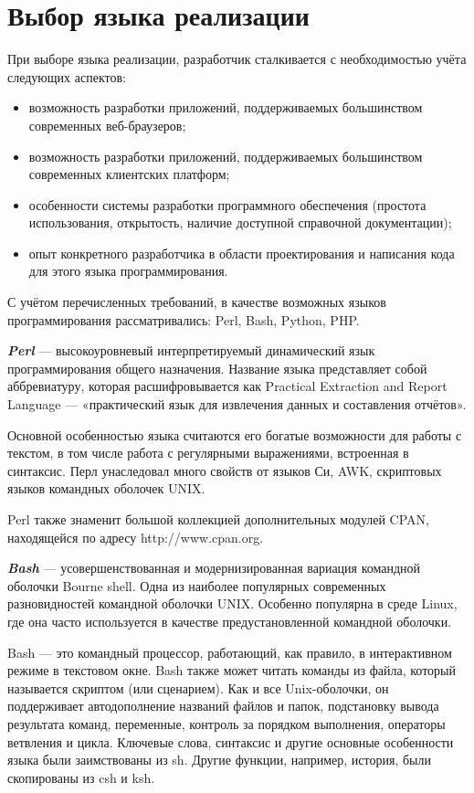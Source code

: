 \section{Выбор языка реализации} \label{technologic_langiage}


При выборе языка реализации, разработчик сталкивается с необходимостью учёта следующих аспектов:
\begin{itemize}
	\item возможность разработки приложений, поддерживаемых большинством современных веб-браузеров;
	\item возможность разработки приложений, поддерживаемых большинством современных клиентских платформ;
	\item особенности системы разработки программного обеспечения (простота использования, открытость, наличие доступной справочной документации);
	\item опыт конкретного разработчика в области проектирования и написания кода для этого языка программирования.
\end{itemize}

С учётом перечисленных требований, в качестве возможных языков программирования рассматривались: Perl, Bash, Python, PHP.

\vspace{\baselineskip}
\textbf{\textit{Perl}} ---  высокоуровневый интерпретируемый динамический язык программирования общего назначения. Название языка представляет собой аббревиатуру, которая расшифровывается как Practical Extraction and Report Language — «практический язык для извлечения данных и составления отчётов».

Основной особенностью языка считаются его богатые возможности для работы с текстом, в том числе работа с регулярными выражениями, встроенная в синтаксис. Перл унаследовал много свойств от языков Си, AWK, скриптовых языков командных оболочек UNIX.

Perl также знаменит большой коллекцией дополнительных модулей CPAN, находящейся по адресу http://www.cpan.org.

\vspace{\baselineskip}
\textbf{\textit{Bash}} --- усовершенствованная и модернизированная вариация командной оболочки Bourne shell. Одна из наиболее популярных современных разновидностей командной оболочки UNIX. Особенно популярна в среде Linux, где она часто используется в качестве предустановленной командной оболочки.

Bash — это командный процессор, работающий, как правило, в интерактивном режиме в текстовом окне. Bash также может читать команды из файла, который называется скриптом (или сценарием). Как и все Unix-оболочки, он поддерживает автодополнение названий файлов и папок, подстановку вывода результата команд, переменные, контроль за порядком выполнения, операторы ветвления и цикла. Ключевые слова, синтаксис и другие основные особенности языка были заимствованы из sh. Другие функции, например, история, были скопированы из csh и ksh.

